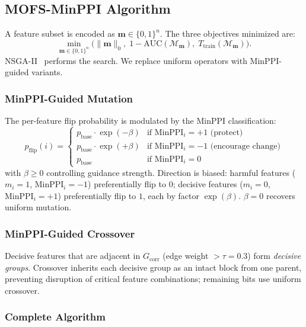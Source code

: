 \documentclass{article} %
\begin{document}
\subsection{MOFS-MinPPI Algorithm}
\label{sec:mofs-minppi}

A feature subset is encoded as $\mathbf{m}\in\{0,1\}^n$. The three objectives minimized are:
\begin{equation}
\min_{\mathbf{m}\in\{0,1\}^n} \bigl( \|\mathbf{m}\|_0,\; 1 - \text{AUC}(\mathcal{M}_{\mathbf{m}}),\; T_{\text{train}}(\mathcal{M}_{\mathbf{m}}) \bigr).
\label{eq:mo-obj}
\end{equation}
NSGA-II~\citep{deb2002fast} performs the search. We replace uniform operators with MinPPI-guided variants.

\subsubsection{MinPPI-Guided Mutation}

The per-feature flip probability is modulated by the MinPPI classification:
\begin{equation}
p_{\text{flip}}(i) = \begin{cases}
p_{\text{base}} \cdot \exp(-\beta) & \text{if } \text{MinPPI}_i = +1 \text{ (protect)} \\[4pt]
p_{\text{base}} \cdot \exp(+\beta) & \text{if } \text{MinPPI}_i = -1 \text{ (encourage change)} \\[4pt]
p_{\text{base}} & \text{if } \text{MinPPI}_i = 0
\end{cases}
\label{eq:mutation}
\end{equation}
with $\beta \geq 0$ controlling guidance strength. Direction is biased: harmful features ($m_i=1$, $\text{MinPPI}_i=-1$) preferentially flip to $0$; decisive features ($m_i=0$, $\text{MinPPI}_i=+1$) preferentially flip to $1$, each by factor $\exp(\beta)$. $\beta=0$ recovers uniform mutation.

\subsubsection{MinPPI-Guided Crossover}

Decisive features that are adjacent in $G_{\text{corr}}$ (edge weight $> \tau=0.3$) form \emph{decisive groups}. Crossover inherits each decisive group as an intact block from one parent, preventing disruption of critical feature combinations; remaining bits use uniform crossover.

\subsubsection{Complete Algorithm}
\end{document}
